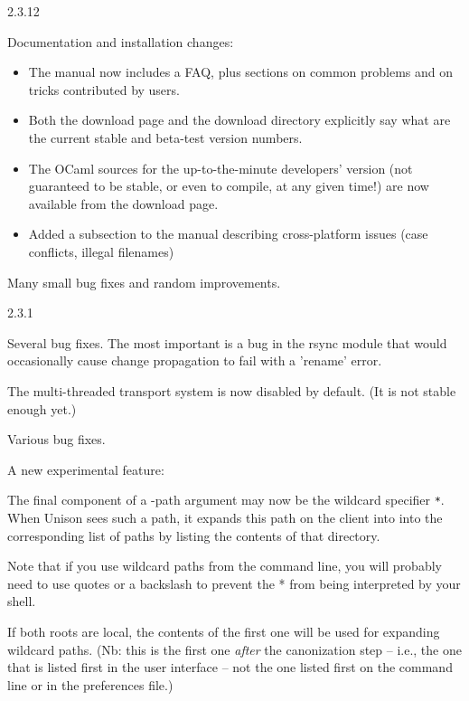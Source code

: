 \begin{changesfromversion}{2.3.12}
\item Documentation and installation changes:
\begin{itemize}
\item The manual now includes a FAQ, plus sections on common problems and
on tricks contributed by users.
\item Both the download page and the download directory explicitly say
what are the current stable and beta-test version numbers.
\item The OCaml sources for the up-to-the-minute developers' version (not
guaranteed to be stable, or even to compile, at any given time!) are now
available from the download page.
\item Added a subsection to the manual describing cross-platform
  issues (case conflicts, illegal filenames)
\end{itemize}

\item Many small bug fixes and random improvements.

\end{changesfromversion}

\begin{changesfromversion}{2.3.1}
\item Several bug fixes.  The most important is a bug in the rsync
module that would occasionally cause change propagation to fail with a
'rename' error.
\end{changesfromversion}

\begin{changesfromversion}{2.2}
\item The multi-threaded transport system is now disabled by default.
(It is not stable enough yet.)
\item Various bug fixes.
\item A new experimental feature: 

  The final component of a -path argument may now be the wildcard 
  specifier \verb|*|.  When Unison sees such a path, it expands this path on 
  the client into into the corresponding list of paths by listing the
  contents of that directory.  

  Note that if you use wildcard paths from the command line, you will
  probably need to use quotes or a backslash to prevent the * from
  being interpreted by your shell.

  If both roots are local, the contents of the first one will be used
  for expanding wildcard paths.  (Nb: this is the first one {\em after} the
  canonization step -- i.e., the one that is listed first in the user 
  interface -- not the one listed first on the command line or in the
  preferences file.)
\end{changesfromversion}

